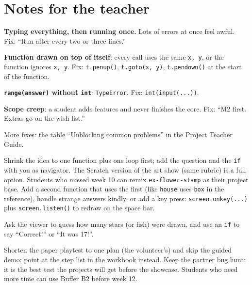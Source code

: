 \section{Notes for the teacher}
\begin{commonmistakes}
  \item \textbf{Typing everything, then running once.} Lots of errors at once feel awful. Fix: \enquote{Run after every two or three lines.}
  \item \textbf{Function drawn on top of itself}: every call uses the same \texttt{x, y}, or the function ignores \texttt{x, y}. Fix: \texttt{t.penup()}, \texttt{t.goto(x, y)}, \texttt{t.pendown()} at the start of the function.
  \item \textbf{\texttt{range(answer)} without \texttt{int}}: \texttt{TypeError}. Fix: \texttt{int(input(...))}.
  \item \textbf{Scope creep}: a student adds features and never finishes the core. Fix: \enquote{M2 first. Extras go on the wish list.}
  \item More fixes: the table \enquote{Unblocking common problems} in the Project Teacher Guide.
\end{commonmistakes}
\begin{differentiation}
\supportpath Shrink the idea to one function plus one loop first; add the question and the \texttt{if} with you as navigator. The Scratch version of the art show (same rubric) is a full option. Students who missed week 10 can remix \texttt{ex-flower-stamp} as their project base.
\extensionpath Add a second function that uses the first (like \texttt{house} uses \texttt{box} in the reference), handle strange answers kindly, or add a key press: \texttt{screen.onkey(...)} plus \texttt{screen.listen()} to redraw on the space bar.
\end{differentiation}
\begin{stretchchallenge}
Ask the viewer to guess how many stars (or fish) were drawn, and use an \texttt{if} to say \enquote{Correct!} or \enquote{It was 17!}.
\end{stretchchallenge}
\begin{teachernote}
Shorten the paper playtest to one plan (the volunteer's) and skip the guided demo: point at the step list in the workbook instead. Keep the partner bug hunt: it is the best test the projects will get before the showcase. Students who need more time can use Buffer B2 before week 12.
\end{teachernote}
